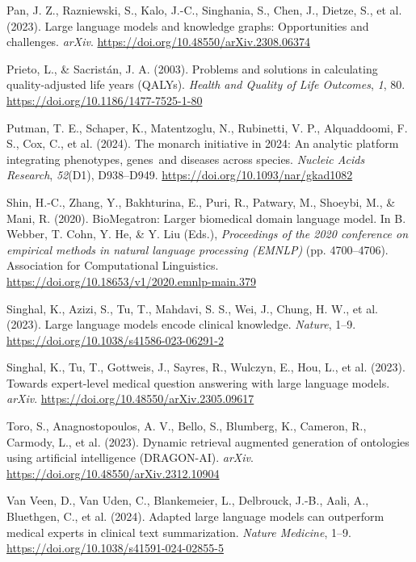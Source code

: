 \documentclass[
]{agujournal2019}
\newlength{\cslhangindent}
\newenvironment{CSLReferences}[2] %
 {\begin{list}{}{%
  \setlength{\itemindent}{0pt}
  \setlength{\leftmargin}{0pt}
  \setlength{\parsep}{0pt}
  \ifodd #1
   \setlength{\leftmargin}{\cslhangindent}
   \setlength{\itemindent}{-1\cslhangindent}
  \fi
  \setlength{\itemsep}{#2\baselineskip}}}
 {\end{list}}
\begin{document}
\begin{CSLReferences}{1}{0}
Pan, J. Z., Razniewski, S., Kalo, J.-C., Singhania, S., Chen, J.,
Dietze, S., et al. (2023). Large language models and knowledge graphs:
Opportunities and challenges. \emph{arXiv}.
\url{https://doi.org/10.48550/arXiv.2308.06374}

Prieto, L., \& Sacristán, J. A. (2003). Problems and solutions in
calculating quality-adjusted life years (QALYs). \emph{Health and
Quality of Life Outcomes}, \emph{1}, 80.
\url{https://doi.org/10.1186/1477-7525-1-80}

Putman, T. E., Schaper, K., Matentzoglu, N., Rubinetti, V. P.,
Alquaddoomi, F. S., Cox, C., et al. (2024). The monarch initiative in
2024: An analytic platform integrating phenotypes, genes~and diseases
across species. \emph{Nucleic Acids Research}, \emph{52}(D1),
D938--D949. \url{https://doi.org/10.1093/nar/gkad1082}

Shin, H.-C., Zhang, Y., Bakhturina, E., Puri, R., Patwary, M., Shoeybi,
M., \& Mani, R. (2020). BioMegatron: Larger biomedical domain language
model. In B. Webber, T. Cohn, Y. He, \& Y. Liu (Eds.), \emph{Proceedings
of the 2020 conference on empirical methods in natural language
processing (EMNLP)} (pp. 4700--4706). Association for Computational
Linguistics. \url{https://doi.org/10.18653/v1/2020.emnlp-main.379}

Singhal, K., Azizi, S., Tu, T., Mahdavi, S. S., Wei, J., Chung, H. W.,
et al. (2023). Large language models encode clinical knowledge.
\emph{Nature}, 1--9. \url{https://doi.org/10.1038/s41586-023-06291-2}

Singhal, K., Tu, T., Gottweis, J., Sayres, R., Wulczyn, E., Hou, L., et
al. (2023). Towards expert-level medical question answering with large
language models. \emph{arXiv}.
\url{https://doi.org/10.48550/arXiv.2305.09617}

Toro, S., Anagnostopoulos, A. V., Bello, S., Blumberg, K., Cameron, R.,
Carmody, L., et al. (2023). Dynamic retrieval augmented generation of
ontologies using artificial intelligence (DRAGON-AI). \emph{arXiv}.
\url{https://doi.org/10.48550/arXiv.2312.10904}

Van Veen, D., Van Uden, C., Blankemeier, L., Delbrouck, J.-B., Aali, A.,
Bluethgen, C., et al. (2024). Adapted large language models can
outperform medical experts in clinical text summarization. \emph{Nature
Medicine}, 1--9. \url{https://doi.org/10.1038/s41591-024-02855-5}


\end{CSLReferences}
\end{document}
